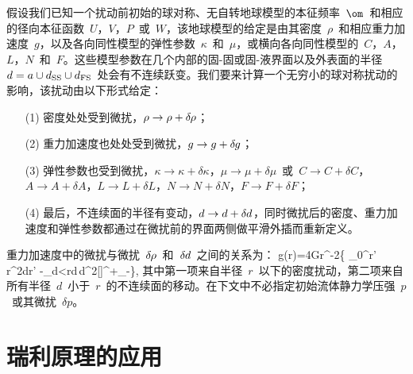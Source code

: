 假设我们已知一个扰动前初始的球对称、无自转地球模型的本征频率~$\om$~和相应的径向本征函数~$U$，$V$，$P$~或~$W$，该地球模型的给定是由其密度~$\rho$~和相应重力加速度~$g$，以及各向同性模型的弹性参数~$\kappa$~和~$\mu$，或横向各向同性模型的~$C$，$A$，$L$，$N$~和~$F$。这些模型参数在几个内部的固-固或固-液界面以及外表面的半径~$d=a\cup d_{\rm SS}\cup d_{\rm FS}$~处会有不连续跃变。我们要来计算一个无穷小的球对称扰动的影响，该扰动由以下形式给定：
\begin{enumerate}
\item[(1)]
%
密度处处受到微扰，$\rho\rightarrow\rho+\delta\hspace{-0.2 mm}\rho$；
\item[(2)]
%
重力加速度也处处受到微扰，$g\rightarrow g+\delta\hspace{-0.2 mm}g$；
\item[(3)]
%
弹性参数也受到微扰，$\kappa\rightarrow\kappa+\delta\kappa$，$\mu\rightarrow\mu+\delta\mu$~或~$C\rightarrow C+\delta C$，$A\rightarrow A+\delta A$，$L\rightarrow L+\delta L$，$N\rightarrow N+\delta N$，$F\rightarrow F+\delta F$；
\item[(4)]
%
最后，不连续面的半径有变动，$d\rightarrow d+\delta\hspace{-0.1 mm}d$，同时微扰后的密度、重力加速度和弹性参数都通过在微扰前的界面两侧做平滑外插而重新定义。
\end{enumerate}
重力加速度中的微扰与微扰~$\delta\hspace{-0.2 mm}\rho$~和~$\delta\hspace{-0.1 mm}d$~之间的关系为：
\eq  \label{eq:9.dg}
\delta\hspace{-0.2 mm}g(r)=4\pi Gr^{-2}\left\{
\int_0^r\delta\hspace{-0.2 mm}\rho'\,r^{\prime\hspace{0.2 mm}2}dr'
-\sum_{d<r}\delta\hspace{-0.1 mm}d\,d^2[\rho]^+_-\right\},
\en
其中第一项来自半径~$r$~以下的密度扰动，第二项来自所有半径~$d$~小于~$r$~的不连续面的移动。在下文中不必指定初始流体静力学压强~$p$~或其微扰~$\delta p$。
%

\section{瑞利原理的应用}
%
\label{section:perttheory}

